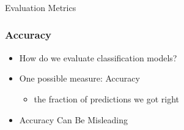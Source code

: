 



\begin{frame}[fragile]\frametitle{}
\begin{center}
{\Large Evaluation Metrics}
\end{center}
\end{frame}


\begin{frame}[fragile]\frametitle{Accuracy}
\begin{itemize}
\item How do we evaluate classification models?
\item One possible measure: Accuracy
	\begin{itemize}
	\item the fraction of predictions we got right
	\end{itemize}
\item Accuracy Can Be Misleading
\end{itemize}

\end{frame}

